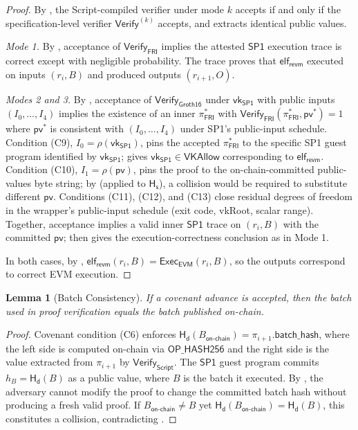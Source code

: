 \documentclass[11pt,a4paper]{article}
\newtheorem{lemma}[theorem]{Lemma}
\newcommand{\Hashd}{\mathsf{H_d}}        %
\newcommand{\Hashs}{\mathsf{H_s}}        %
\newcommand{\Verify}{\mathsf{Verify}}
\newcommand{\Exec}{\mathsf{Exec}}
\newcommand{\FRI}{\mathsf{FRI}}
\newcommand{\Groth}{\mathsf{Groth16}}    %
\newcommand{\SPone}{\mathsf{SP1}}
\newcommand{\revm}{\textsf{revm}}
\newcommand{\EVM}{\mathsf{EVM}}
\newcommand{\vkSP}{\mathsf{vk}_{\SPone}}           %
\newcommand{\VKAllow}{\mathsf{VKAllow}}            %
\begin{document}
\begin{proof}
By , the Script-compiled verifier under mode $k$ accepts if and only if the specification-level verifier $\Verify^{(k)}$ accepts, and extracts identical public values.

\emph{Mode 1.} By , acceptance of $\Verify_{\FRI}$ implies the attested $\SPone$ execution trace is correct except with negligible probability. The trace proves that $\mathsf{elf}_{\revm}$ executed on inputs $(r_i, B)$ and produced outputs $(r_{i+1}, O)$.

\emph{Modes 2 and 3.} By , acceptance of $\Verify_{\Groth}$ under $\vkSP$ with public inputs $(I_0, \ldots, I_4)$ implies the existence of an inner $\pi_{\FRI}^*$ with $\Verify_{\FRI}(\pi_{\FRI}^*, \mathsf{pv}^*) = 1$ where $\mathsf{pv}^*$ is consistent with $(I_0, \ldots, I_4)$ under SP1's public-input schedule. Condition (C9), $I_0 = \rho(\vkSP)$, pins the accepted $\pi_{\FRI}^*$ to the specific SP1 guest program identified by $\vkSP$;  gives $\vkSP \in \VKAllow$ corresponding to $\mathsf{elf}_{\revm}$. Condition (C10), $I_1 = \rho(\mathsf{pv})$, pins the proof to the on-chain-committed public-values byte string; by  (applied to $\Hashs$), a collision would be required to substitute different $\mathsf{pv}$. Conditions (C11), (C12), and (C13) close residual degrees of freedom in the wrapper's public-input schedule (exit code, vkRoot, scalar range). Together, acceptance implies a valid inner $\SPone$ trace on $(r_i, B)$ with the committed $\mathsf{pv}$;  then gives the execution-correctness conclusion as in Mode 1.

In both cases, by , $\mathsf{elf}_{\revm}(r_i, B) = \Exec_{\EVM}(r_i, B)$, so the outputs correspond to correct EVM execution. \qedhere
\end{proof}

\begin{lemma}[Batch Consistency]\label{lem:batch}
If a covenant advance is accepted, then the batch used in proof verification equals the batch published on-chain.
\end{lemma}

\begin{proof}
Covenant condition (C6) enforces $\Hashd(B_{\mathsf{on\text{-}chain}}) = \pi_{i+1}.\mathsf{batch\_hash}$, where the left side is computed on-chain via $\mathsf{OP\_HASH256}$ and the right side is the value extracted from $\pi_{i+1}$ by $\Verify_{\mathsf{Script}}$. The $\SPone$ guest program commits $h_B = \Hashd(B)$ as a public value, where $B$ is the batch it executed. By , the adversary cannot modify the proof to change the committed batch hash without producing a fresh valid proof. If $B_{\mathsf{on\text{-}chain}} \neq B$ yet $\Hashd(B_{\mathsf{on\text{-}chain}}) = \Hashd(B)$, this constitutes a collision, contradicting . \qedhere
\end{proof}
\end{document}
